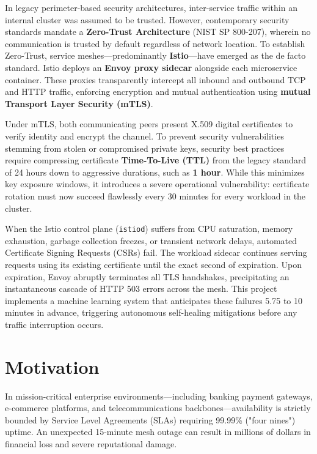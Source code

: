 \documentclass[12pt,a4paper]{report}
\begin{document}
In legacy perimeter-based security architectures, inter-service traffic within an internal cluster was assumed to be trusted. However, contemporary security standards mandate a \textbf{Zero-Trust Architecture} (NIST SP 800-207), wherein no communication is trusted by default regardless of network location. To establish Zero-Trust, service meshes—predominantly \textbf{Istio}—have emerged as the de facto standard. Istio deploys an \textbf{Envoy proxy sidecar} alongside each microservice container. These proxies transparently intercept all inbound and outbound TCP and HTTP traffic, enforcing encryption and mutual authentication using \textbf{mutual Transport Layer Security (mTLS)}.

Under mTLS, both communicating peers present X.509 digital certificates to verify identity and encrypt the channel. To prevent security vulnerabilities stemming from stolen or compromised private keys, security best practices require compressing certificate \textbf{Time-To-Live (TTL)} from the legacy standard of 24 hours down to aggressive durations, such as \textbf{1 hour}. While this minimizes key exposure windows, it introduces a severe operational vulnerability: certificate rotation must now succeed flawlessly every 30 minutes for every workload in the cluster.

When the Istio control plane (\texttt{istiod}) suffers from CPU saturation, memory exhaustion, garbage collection freezes, or transient network delays, automated Certificate Signing Requests (CSRs) fail. The workload sidecar continues serving requests using its existing certificate until the exact second of expiration. Upon expiration, Envoy abruptly terminates all TLS handshakes, precipitating an instantaneous cascade of HTTP 503 errors across the mesh. This project implements a machine learning system that anticipates these failures 5.75 to 10 minutes in advance, triggering autonomous self-healing mitigations before any traffic interruption occurs.

\section{Motivation}
In mission-critical enterprise environments—including banking payment gateways, e-commerce platforms, and telecommunications backbones—availability is strictly bounded by Service Level Agreements (SLAs) requiring 99.99\% ("four nines") uptime. An unexpected 15-minute mesh outage can result in millions of dollars in financial loss and severe reputational damage.
\end{document}
